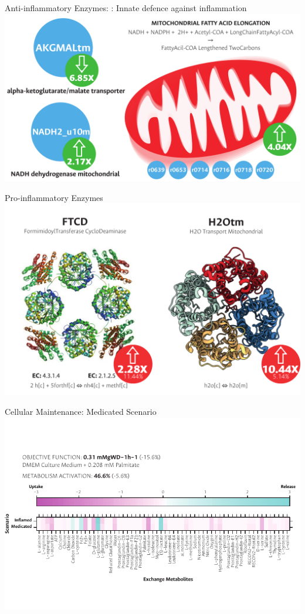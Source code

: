 \documentclass[11pt]{beamer}
\begin{document}
\begin{frame}{Anti-inflammatory Enzymes: : Innate defence against inflammation}
\includegraphics[width=\textwidth]{Antiinflammatory}
\end{frame}
\begin{frame}{Pro-inflammatory Enzymes}
\includegraphics[width=\textwidth]{Proinflammatory}
\end{frame}
\begin{frame}{Cellular Maintenance: Medicated Scenario}
\includegraphics[width=\textwidth]{M-results}
\end{frame}
\end{document}
